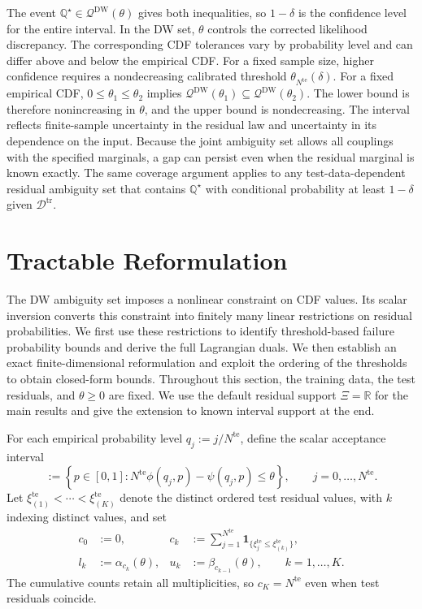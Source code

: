 \documentclass[review,11pt,3p,authoryear,nopreprintline]{elsarticle}
\begin{document}
The event $\mathbb Q^\star\in\mathscr Q^{\mathrm{DW}}(\theta)$ gives both inequalities, so $1-\delta$ is the confidence level for the entire interval. In the DW set, $\theta$ controls the corrected likelihood discrepancy. The corresponding CDF tolerances vary by probability level and can differ above and below the empirical CDF. For a fixed sample size, higher confidence requires a nondecreasing calibrated threshold $\theta_{N^{\mathrm{te}}}(\delta)$. For a fixed empirical CDF, $0\le\theta_1\le\theta_2$ implies $\mathscr Q^{\mathrm{DW}}(\theta_1)\subseteq\mathscr Q^{\mathrm{DW}}(\theta_2)$. The lower bound is therefore nonincreasing in $\theta$, and the upper bound is nondecreasing. The interval reflects finite-sample uncertainty in the residual law and uncertainty in its dependence on the input. Because the joint ambiguity set allows all couplings with the specified marginals, a gap can persist even when the residual marginal is known exactly. The same coverage argument applies to any test-data-dependent residual ambiguity set that contains $\mathbb Q^\star$ with conditional probability at least $1-\delta$ given $\mathcal D^{\mathrm{tr}}$.


\section{Tractable Reformulation}
\label{sec-reformulation}

The DW ambiguity set imposes a nonlinear constraint on CDF values. Its scalar inversion converts this constraint into finitely many linear restrictions on residual probabilities. We first use these restrictions to identify threshold-based failure probability bounds and derive the full Lagrangian duals. We then establish an exact finite-dimensional reformulation and exploit the ordering of the thresholds to obtain closed-form bounds. Throughout this section, the training data, the test residuals, and $\theta\ge0$ are fixed. We use the default residual support $\Xi=\mathbb R$ for the main results and give the extension to known interval support at the end.

For each empirical probability level $q_j:=j/N^{\mathrm{te}}$, define the scalar acceptance interval
\begin{equation}
  [\alpha_j(\theta),\beta_j(\theta)]
  :=\left\{p\in[0,1]:
  N^{\mathrm{te}}\phi(q_j,p)-\psi(q_j,p)\le\theta\right\},
  \qquad j=0,\ldots,N^{\mathrm{te}}.
  \label{eq-dw-rank-acceptance}
\end{equation}
Let $\xi_{(1)}^{\mathrm{te}}<\cdots<\xi_{(K)}^{\mathrm{te}}$ denote the distinct ordered test residual values, with $k$ indexing distinct values, and set
\begin{equation}
  \begin{aligned}
    c_0&:=0,&
    c_k&:=\sum_{j=1}^{N^{\mathrm{te}}}\mathbf1_{\{\xi_j^{\mathrm{te}}\le\xi_{(k)}^{\mathrm{te}}\}},\\
    l_k&:=\alpha_{c_k}(\theta),&
    u_k&:=\beta_{c_{k-1}}(\theta),\qquad k=1,\ldots,K.
  \end{aligned}
  \label{eq-dw-counts-and-levels}
\end{equation}
The cumulative counts retain all multiplicities, so $c_K=N^{\mathrm{te}}$ even when test residuals coincide.
\end{document}
